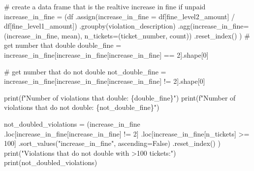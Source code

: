 \documentclass[
  letterpaper,
  DIV=11,
  numbers=noendperiod]{scrartcl}
\newenvironment{Shaded}{\begin{snugshade}}{\end{snugshade}}
\newcommand{\BuiltInTok}[1]{\textcolor[rgb]{0.00,0.23,0.31}{#1}}
\newcommand{\CommentTok}[1]{\textcolor[rgb]{0.37,0.37,0.37}{#1}}
\newcommand{\DecValTok}[1]{\textcolor[rgb]{0.68,0.00,0.00}{#1}}
\newcommand{\NormalTok}[1]{\textcolor[rgb]{0.00,0.23,0.31}{#1}}
\newcommand{\OperatorTok}[1]{\textcolor[rgb]{0.37,0.37,0.37}{#1}}
\newcommand{\SpecialCharTok}[1]{\textcolor[rgb]{0.37,0.37,0.37}{#1}}
\newcommand{\SpecialStringTok}[1]{\textcolor[rgb]{0.13,0.47,0.30}{#1}}
\newcommand{\StringTok}[1]{\textcolor[rgb]{0.13,0.47,0.30}{#1}}
\newcommand{\VariableTok}[1]{\textcolor[rgb]{0.07,0.07,0.07}{#1}}
\begin{document}
\begin{Shaded}
\begin{Highlighting}[]
\CommentTok{\# create a data frame that is the realtive increase in fine if unpaid}
\NormalTok{increase\_in\_fine }\OperatorTok{=}\NormalTok{ (df}
\NormalTok{    .assign(increase\_in\_fine }\OperatorTok{=}\NormalTok{ df[}\StringTok{\textquotesingle{}fine\_level2\_amount\textquotesingle{}}\NormalTok{] }\OperatorTok{/}\NormalTok{ df[}\StringTok{\textquotesingle{}fine\_level1\_amount\textquotesingle{}}\NormalTok{])}
\NormalTok{    .groupby(}\StringTok{\textquotesingle{}violation\_description\textquotesingle{}}\NormalTok{)}
\NormalTok{    .agg(increase\_in\_fine}\OperatorTok{=}\NormalTok{(}\StringTok{\textquotesingle{}increase\_in\_fine\textquotesingle{}}\NormalTok{, }\StringTok{\textquotesingle{}mean\textquotesingle{}}\NormalTok{),}
\NormalTok{        n\_tickets}\OperatorTok{=}\NormalTok{(}\StringTok{\textquotesingle{}ticket\_number\textquotesingle{}}\NormalTok{, }\StringTok{\textquotesingle{}count\textquotesingle{}}\NormalTok{))}
\NormalTok{    .reset\_index()}
\NormalTok{)}
\CommentTok{\# get number that double}
\NormalTok{double\_fine }\OperatorTok{=}\NormalTok{ increase\_in\_fine[increase\_in\_fine[}\StringTok{\textquotesingle{}increase\_in\_fine\textquotesingle{}}\NormalTok{] }\OperatorTok{==} \DecValTok{2}\NormalTok{].shape[}\DecValTok{0}\NormalTok{]}

\CommentTok{\# get number that do not double}
\NormalTok{not\_double\_fine }\OperatorTok{=}\NormalTok{ increase\_in\_fine[increase\_in\_fine[}\StringTok{\textquotesingle{}increase\_in\_fine\textquotesingle{}}\NormalTok{] }\OperatorTok{!=} \DecValTok{2}\NormalTok{].shape[}\DecValTok{0}\NormalTok{]}

\BuiltInTok{print}\NormalTok{(}\SpecialStringTok{f"Number of violations that double: }\SpecialCharTok{\{}\NormalTok{double\_fine}\SpecialCharTok{\}}\SpecialStringTok{"}\NormalTok{)}
\BuiltInTok{print}\NormalTok{(}\SpecialStringTok{f"Number of violations that do not double: }\SpecialCharTok{\{}\NormalTok{not\_double\_fine}\SpecialCharTok{\}}\SpecialStringTok{"}\NormalTok{)}

\NormalTok{not\_doubled\_violations }\OperatorTok{=}\NormalTok{ (increase\_in\_fine}
\NormalTok{    .loc[increase\_in\_fine[}\StringTok{\textquotesingle{}increase\_in\_fine\textquotesingle{}}\NormalTok{] }\OperatorTok{!=} \DecValTok{2}\NormalTok{]}
\NormalTok{    .loc[increase\_in\_fine[}\StringTok{\textquotesingle{}n\_tickets\textquotesingle{}}\NormalTok{] }\OperatorTok{\textgreater{}=} \DecValTok{100}\NormalTok{]}
\NormalTok{    .sort\_values(}\StringTok{"increase\_in\_fine"}\NormalTok{, ascending}\OperatorTok{=}\VariableTok{False}\NormalTok{)}
\NormalTok{    .reset\_index()}
\NormalTok{)}
\BuiltInTok{print}\NormalTok{(}\StringTok{"Violations that do not double with \textgreater{}100 tickets:"}\NormalTok{)}
\BuiltInTok{print}\NormalTok{(not\_doubled\_violations)}
\end{Highlighting}
\end{Shaded}
\end{document}
